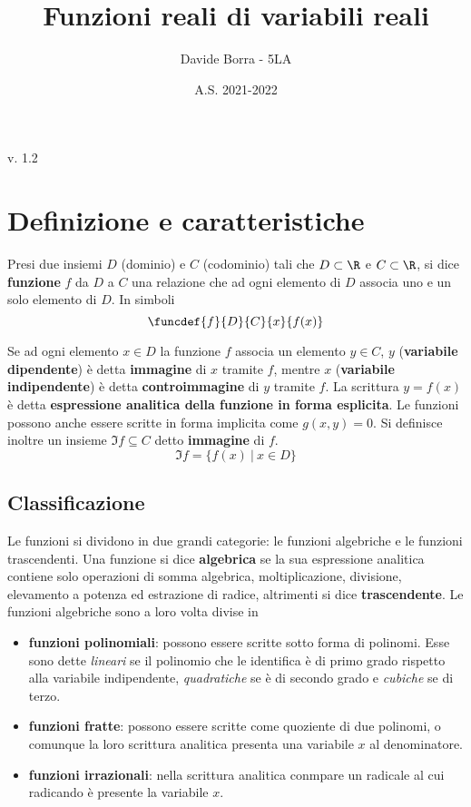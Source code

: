 \documentclass{article}     %
\title{Funzioni reali di variabili reali}
\author{Davide Borra - 5LA}
\date{A.S. 2021-2022}
\begin{document}
    \begin{titlepage}
    \maketitle
    \tableofcontents
    \vspace{\fill}
    \hspace{\fill} v. 1.2   %
    \end{titlepage}
    
    \chead{}

    \section{Definizione e caratteristiche}
        \begin{boxdef}
            Presi due insiemi $D$ (dominio) e $C$ (codominio) tali che $D \subset \R$ e $C \subset \R$, si dice \textbf{funzione} $f$ da $D$ a $C$ una relazione che ad ogni elemento di $D$ associa uno e un solo elemento di $D$. In simboli \[\funcdef{f}{D}{C}{x}{f(x)} \]
        \end{boxdef}
        Se ad ogni elemento $x \in D$ la funzione $f$ associa un elemento $y\in C$, $y$ (\textbf{variabile dipendente}) è detta \textbf{immagine} di $x$ tramite $f$, mentre $x$ (\textbf{variabile indipendente}) è detta \textbf{controimmagine} di $y$ tramite $f$. La scrittura $y=f(x)$ è detta \textbf{espressione analitica della funzione in forma esplicita}. Le funzioni possono anche essere scritte in forma implicita come $g(x,y)=0$. Si definisce inoltre un insieme $\Im f\subseteq C$ detto \textbf{immagine} di $f$.
        \[\Im f=\{f(x)\:|\: x \in D\}\] 
    
    \subsection{Classificazione}
        Le funzioni si dividono in due grandi categorie: le funzioni algebriche e le funzioni trascendenti. Una funzione si dice \textbf{algebrica} se la sua espressione analitica contiene solo operazioni di somma algebrica, moltiplicazione, divisione, elevamento a potenza ed estrazione di radice, altrimenti si dice \textbf{trascendente}. Le funzioni algebriche sono a loro volta divise in \begin{itemize}
            \item \textbf{funzioni polinomiali}: possono essere scritte sotto forma di polinomi. Esse sono dette \textit{lineari} se il polinomio che le identifica è di primo grado rispetto alla variabile indipendente, \textit{quadratiche} se è di secondo grado e \textit{cubiche} se di terzo.
            \item \textbf{funzioni fratte}: possono essere scritte come quoziente di due polinomi, o comunque la loro scrittura analitica presenta una variabile $x$ al denominatore.
            \item \textbf{funzioni irrazionali}: nella scrittura analitica conmpare un radicale al cui radicando è presente la variabile $x$.
        \end{itemize}
\end{document}

